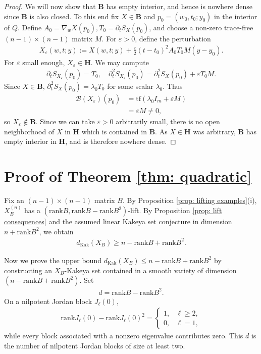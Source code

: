 \documentclass[reqno,11pt]{amsart}
\numberwithin{equation}{section}
\numberwithin{figure}{section}
\def\eps{\varepsilon}
\renewcommand\leq{\leqslant}
\renewcommand\geq{\geqslant}
\theoremstyle{plain}
\theoremstyle{definition}
\newcommand{\rank}{\mathrm{rank}}
\newcommand{\Kak}{\mathrm{Kak}}
\begin{document}
\begin{proof}
        We will now show that $\mathbf B$ has empty interior, and hence is nowhere dense since $\mathbf B$ is also closed. To this end fix $X \in \mathbf B$ and $p_0 = (w_0,t_0;y_0)$ in the interior of $Q$. Define $A_0 = \nabla_w X(p_0), T_0=\partial_t S_X(p_0)$, and choose a non-zero trace-free $(n-1)\times (n-1)$ matrix $M$. For $\eps > 0$, define the perturbation 
        \begin{align}
            X_{\eps}(w,t;y) := X(w,t;y) + \frac{\eps}{2} (t-t_0)^2 A_0 T_0M (y-y_0).
        \end{align}
        For $\eps$ small enough, $X_\eps \in \mathbf H$. We may compute
        \begin{align}
            \partial_t S_{X_\eps}(p_0) = T_0, \quad \partial_t^2 S_{X_\eps}(p_0) = \partial_t^2 S_X(p_0) + \eps T_0 M.
        \end{align}
        Since $X \in \mathbf B$, $\partial_t^2 S_X(p_0) = \lambda_0 T_0$ for some scalar $\lambda_0$. Thus 
        \begin{align}
            \mathcal B(X_\eps)(p_0) &= \mathrm{tf}(\lambda_0 I_m + \eps M) \\
            &= \eps M \neq 0,
        \end{align}
        so $X_\eps \notin \mathbf B$.
        Since we can take $\eps > 0$ arbitrarily small, there is no open neighborhood of $X$ in $\mathbf H$ which is contained in $\mathbf B$. As $X \in \mathbf H$ was arbitrary, $\mathbf B$ has empty interior in $\mathbf H$, and is therefore nowhere dense.
    \end{proof}
    

    \section{Proof of Theorem \ref{thm: quadratic}}\label{sec: thm: quadratic}

    Fix an $(n-1) \times (n-1)$ matrix $B$. By Proposition \ref{prop: lifting examples}(i), $X_B^{(n)}$ has a $(\rank B, \rank B - \rank B^2)$-lift. By Proposition \ref{prop: lift consequences} and the assumed linear Kakeya set conjecture in dimension $n + \rank B^2$, we obtain 
    \begin{align}
        d_{\Kak}(X_B) \geq  n - \rank B + \rank B^2.
    \end{align}

    Now we prove the upper bound $d_{\Kak}(X_B) \leq n - \rank B + \rank B^2$ by constructing an $X_B$-Kakeya set contained in a smooth variety of dimension $(n-\rank B + \rank B^2)$. 
    Set
    \begin{align}
        d = \rank B - \rank B^2.
    \end{align}
    On a nilpotent Jordan block $J_\ell(0)$, 
    \begin{align}
        \rank J_\ell(0) - \rank J_\ell(0)^2 = \begin{cases}
            1, & \ell \geq 2, \\
            0, & \ell = 1,
        \end{cases}
    \end{align}
    while every block associated with a nonzero eigenvalue contributes zero. This $d$ is the number of nilpotent Jordan blocks of size at least two. 
\end{document}

